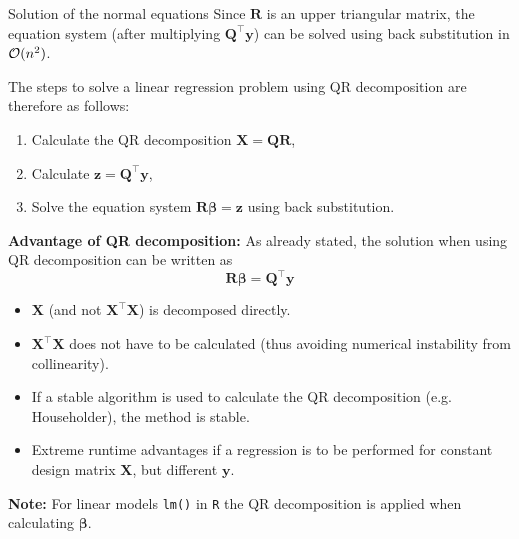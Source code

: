 \begin{vbframe}{Solution of the normal equations}
Since $\textbf{R}$ is an upper triangular matrix, the equation system (after multiplying $\bm{Q}^\top \bm{y}$) can be solved using back substitution in $\mathcal{O}(n^2)$.

\framebreak

The steps to solve a linear regression problem using QR decomposition are therefore as follows:

\begin{enumerate}
\item Calculate the QR decomposition $\mathbf{X} = \mathbf{Q}\mathbf{R}$,
\item Calculate $\bm{z} = \bm{Q}^\top \bm{y}$,
\item Solve the equation system $\bm{R}\boldsymbol{\beta} = \bm{z}$ using back substitution.
\end{enumerate}

\framebreak

\textbf{Advantage of QR decomposition:} As already stated, the solution when using QR decomposition can be written as
$$
\mathbf{R}\boldsymbol{\beta} = \mathbf{Q}^\top\mathbf{y}
$$

\begin{itemize}
\item $\mathbf{X}$ (and not $\bm{X}^\top\bm{X}$) is decomposed directly.
\item $\mathbf{X}^\top\mathbf{X}$ does not have to be calculated (thus avoiding numerical instability from collinearity).\\
\item If a stable algorithm is used to calculate the QR decomposition (e.g. Householder), the method is stable.
\item Extreme runtime advantages if a regression is to be performed for constant design matrix $\bm{X}$, but different $\bm{y}$.
\end{itemize}

\textbf{Note:} For linear models \texttt{lm()} in \texttt{R} the QR decomposition is applied when calculating $\boldsymbol{\beta}$.

\end{vbframe}

